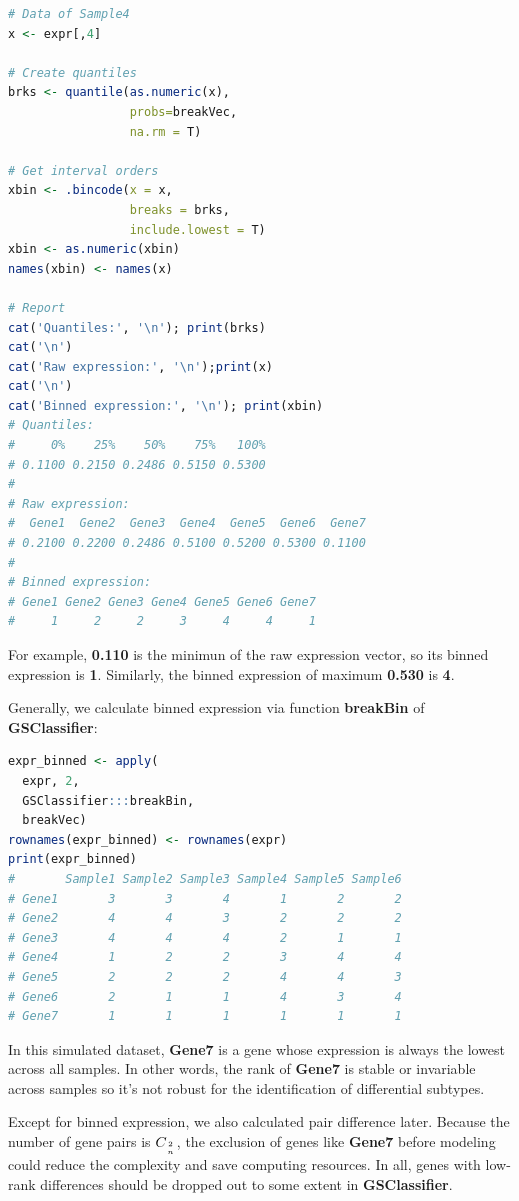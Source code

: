 \documentclass[
  12pt,
]{book}
\begin{document}
\begin{lstlisting}[language=R]
# Data of Sample4
x <- expr[,4]

# Create quantiles  
brks <- quantile(as.numeric(x), 
                 probs=breakVec, 
                 na.rm = T)

# Get interval orders
xbin <- .bincode(x = x, 
                 breaks = brks, 
                 include.lowest = T)
xbin <- as.numeric(xbin)
names(xbin) <- names(x)

# Report
cat('Quantiles:', '\n'); print(brks)
cat('\n')
cat('Raw expression:', '\n');print(x)
cat('\n')
cat('Binned expression:', '\n'); print(xbin)
# Quantiles: 
#     0%    25%    50%    75%   100% 
# 0.1100 0.2150 0.2486 0.5150 0.5300 
# 
# Raw expression: 
#  Gene1  Gene2  Gene3  Gene4  Gene5  Gene6  Gene7 
# 0.2100 0.2200 0.2486 0.5100 0.5200 0.5300 0.1100 
# 
# Binned expression: 
# Gene1 Gene2 Gene3 Gene4 Gene5 Gene6 Gene7 
#     1     2     2     3     4     4     1
\end{lstlisting}

For example, \textbf{0.110} is the minimun of the raw expression vector, so its binned expression is \textbf{1}. Similarly, the binned expression of maximum \textbf{0.530} is \textbf{4}.

Generally, we calculate binned expression via function \textbf{breakBin} of \textbf{GSClassifier}:

\begin{lstlisting}[language=R]
expr_binned <- apply(
  expr, 2, 
  GSClassifier:::breakBin,
  breakVec)
rownames(expr_binned) <- rownames(expr)
print(expr_binned)
#       Sample1 Sample2 Sample3 Sample4 Sample5 Sample6
# Gene1       3       3       4       1       2       2
# Gene2       4       4       3       2       2       2
# Gene3       4       4       4       2       1       1
# Gene4       1       2       2       3       4       4
# Gene5       2       2       2       4       4       3
# Gene6       2       1       1       4       3       4
# Gene7       1       1       1       1       1       1
\end{lstlisting}

In this simulated dataset, \textbf{Gene7} is a gene whose expression is always the lowest across all samples. In other words, the rank of \textbf{Gene7} is stable or invariable across samples so it's not robust for the identification of differential subtypes.

Except for binned expression, we also calculated pair difference later. Because the number of gene pairs is \(C_{2 \atop n}\), the exclusion of genes like \textbf{Gene7} before modeling could reduce the complexity and save computing resources. In all, genes with low-rank differences should be dropped out to some extent in \textbf{GSClassifier}.
\end{document}
